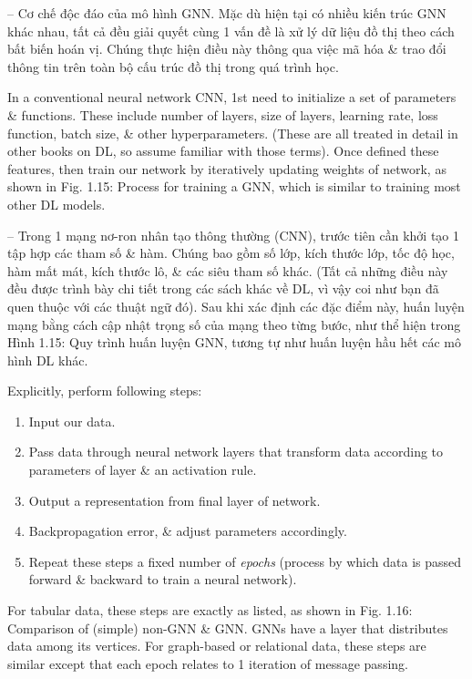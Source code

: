 \documentclass{article}
\begin{document}
\begin{itemize}
\begin{itemize}
\begin{itemize}
            -- {\sf Cơ chế độc đáo của mô hình GNN.} Mặc dù hiện tại có nhiều kiến trúc GNN khác nhau, tất cả đều giải quyết cùng 1 vấn đề là xử lý dữ liệu đồ thị theo cách bất biến hoán vị. Chúng thực hiện điều này thông qua việc mã hóa \& trao đổi thông tin trên toàn bộ cấu trúc đồ thị trong quá trình học.

            In a conventional neural network CNN, 1st need to initialize a set of parameters \& functions. These include number of layers, size of layers, learning rate, loss function, batch size, \& other hyperparameters. (These are all treated in detail in other books on DL, so assume familiar with those terms). Once defined these features, then train our network by iteratively updating weights of network, as shown in {\sf Fig. 1.15: Process for training a GNN, which is similar to training most other DL models.}

            -- Trong 1 mạng nơ-ron nhân tạo thông thường (CNN), trước tiên cần khởi tạo 1 tập hợp các tham số \& hàm. Chúng bao gồm số lớp, kích thước lớp, tốc độ học, hàm mất mát, kích thước lô, \& các siêu tham số khác. (Tất cả những điều này đều được trình bày chi tiết trong các sách khác về DL, vì vậy coi như bạn đã quen thuộc với các thuật ngữ đó). Sau khi xác định các đặc điểm này, huấn luyện mạng bằng cách cập nhật trọng số của mạng theo từng bước, như thể hiện trong {\sf Hình 1.15: Quy trình huấn luyện GNN, tương tự như huấn luyện hầu hết các mô hình DL khác.}

            Explicitly, perform following steps:
            \begin{enumerate}
                \item Input our data.
                \item Pass data through neural network layers that transform data according to parameters of layer \& an activation rule.
                \item Output a representation from final layer of network.
                \item Backpropagation error, \& adjust parameters accordingly.
                \item Repeat these steps a fixed number of {\it epochs} (process by which data is passed forward \& backward to train a neural network).
            \end{enumerate}
            For tabular data, these steps are exactly as listed, as shown in {\sf Fig. 1.16: Comparison of (simple) non-GNN \& GNN. GNNs have a layer that distributes data among its vertices.} For graph-based or relational data, these steps are similar except that each epoch relates to 1 iteration of message passing.


\end{itemize}
\end{itemize}
\end{itemize}
\end{document}
